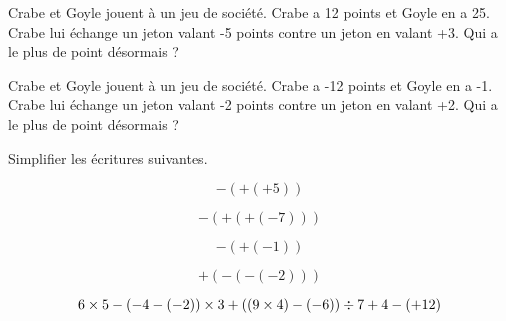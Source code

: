 \begin{minipage}{0.45\textwidth}
    Crabe et Goyle jouent à un jeu de société. Crabe a 12 points et Goyle en a 25.
    Crabe lui échange un jeton valant -5 points contre un jeton en valant +3. 
    Qui a le plus de point désormais ?
    \vspace*{8em}
\end{minipage}
\hfil
\vrule
\hfil
\begin{minipage}{0.45\textwidth}
    Crabe et Goyle jouent à un jeu de société. Crabe a -12 points et Goyle en a -1.
    Crabe lui échange un jeton valant -2 points contre un jeton en valant +2. 
    Qui a le plus de point désormais ?
    \vspace*{8em}
\end{minipage}

 Simplifier les écritures suivantes.

\begin{multicols}{2}
    $$-(+(+5))$$
    \vspace*{3em}

    $$-(+(+(-7)))$$
    \vspace*{7em}\columnbreak

    $$-(+(-1))$$
    \vspace*{3em}

    $$+(-(-(-2)))$$
    \vspace*{7em}
\end{multicols}


$$6\times 5 -(-4-(-2))\times 3 +((9\times 4)-(-6))\div 7+\noindent4-(+12)$$

